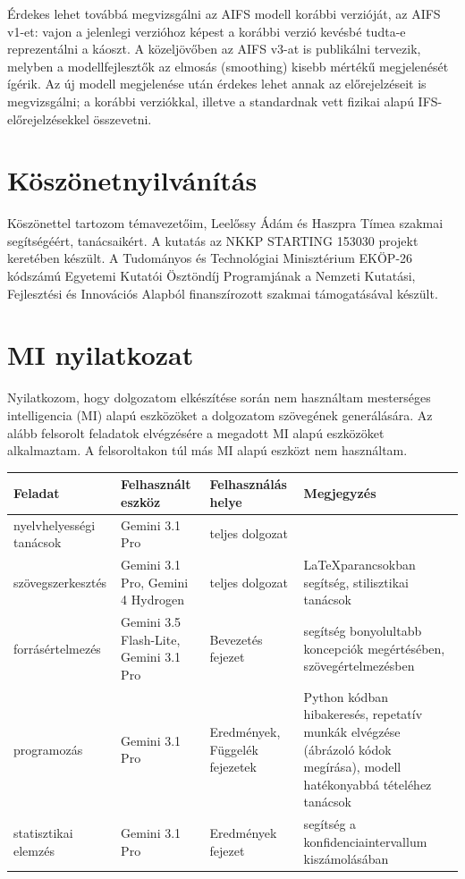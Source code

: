 \documentclass[12pt,a4paper]{article}
\begin{document}
Érdekes lehet továbbá megvizsgálni az AIFS modell korábbi verzióját, az AIFS v1-et: vajon a jelenlegi verzióhoz képest a korábbi verzió kevésbé tudta-e reprezentálni a káoszt. A közeljövőben az AIFS v3-at is publikálni tervezik, melyben a modellfejlesztők az elmosás (smoothing) kisebb mértékű megjelenését ígérik. Az új modell megjelenése után érdekes lehet annak az előrejelzéseit is megvizsgálni; a korábbi verziókkal, illetve a standardnak vett fizikai alapú IFS-előrejelzésekkel összevetni.


\section{Köszönetnyilvánítás}
Köszönettel tartozom témavezetőim, Leelőssy Ádám és Haszpra Tímea szakmai segítségéért, tanácsaikért. A kutatás az NKKP STARTING 153030 projekt keretében készült. A Tudományos és Technológiai Minisztérium EKÖP-26 kódszámú Egyetemi Kutatói Ösztöndíj Programjának a Nemzeti Kutatási, Fejlesztési és Innovációs Alapból finanszírozott szakmai támogatásával készült.

\section{MI nyilatkozat}
Nyilatkozom, hogy dolgozatom elkészítése során nem használtam mesterséges intelligencia (MI) alapú eszközöket a dolgozatom szövegének generálására. Az alább felsorolt feladatok elvégzésére a megadott MI alapú eszközöket alkalmaztam. A felsoroltakon túl más MI alapú eszközt nem használtam.

\begin{table}[H]
    \centering
    \small
    \begin{tabular}{|p{3cm}|p{4cm}|p{3.5cm}|p{4.5cm}|}\hline
       \textbf{Feladat}  & \textbf{Felhasznált eszköz} & \textbf{Felhasználás helye} & \textbf{Megjegyzés}\\\hline

        nyelvhelyességi tanácsok & Gemini 3.1 Pro & 
        teljes dolgozat & \\\hline

        szövegszerkesztés & Gemini 3.1 Pro, Gemini 4 Hydrogen & teljes dolgozat & \LaTeX parancsokban segítség, stilisztikai tanácsok\\\hline

        forrásértelmezés & Gemini 3.5 Flash-Lite, Gemini 3.1 Pro & Bevezetés fejezet & segítség bonyolultabb koncepciók megértésében, szövegértelmezésben \\\hline

        programozás & Gemini 3.1 Pro & Eredmények, Függelék fejezetek & Python kódban hibakeresés, repetatív munkák elvégzése (ábrázoló kódok megírása), modell hatékonyabbá tételéhez tanácsok\\\hline

        statisztikai elemzés & Gemini 3.1 Pro & Eredmények fejezet & segítség a konfidenciaintervallum kiszámolásában \\\hline        
        
    \end{tabular}
\end{table}
\end{document}
